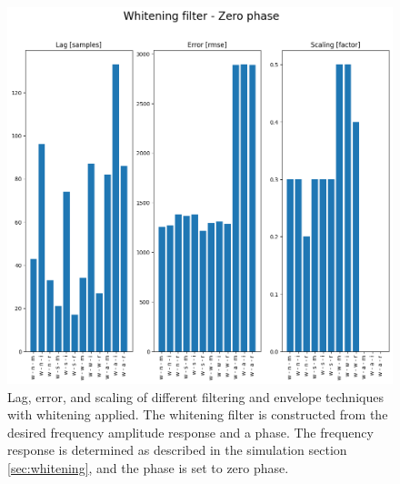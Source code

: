 \begin{figure}[h!t]
	\begin{center}
		\includegraphics[width=1.0\columnwidth]{images/result_whitening_zerophase.png}
	\end{center}
	\caption{Lag, error, and scaling of different filtering and envelope techniques with whitening applied. The whitening filter is constructed from the desired frequency amplitude response and a phase. The frequency response is determined as described in the simulation section \ref{sec:whitening}, and the phase is set to zero phase.}
	\label{fig:result_whitening_zerophase}
\end{figure}